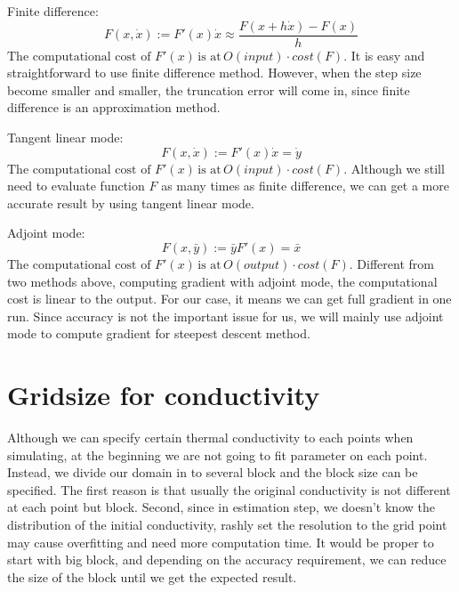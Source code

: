 \documentclass[10pt,a4paper]{report}
\begin{document}
Finite difference:
\[F(x,\dot{x}):=F'(x)\dot{x}\approx {\frac{F(x+h\dot{x})-F(x)}{h}}\]
$\text{The computational cost of }F'(x)\, \text{is at} \, O(input) \cdot cost(F)$.
It is easy and straightforward to use finite difference method. However, when the step size become smaller and smaller, the truncation error will come in, since finite difference is an approximation method. 

Tangent linear mode:
\[F(x,\dot{x}):=F'(x)\dot{x}=\dot{y}\]
$\text{The computational cost of }F'(x)\, \text{is at} \, O(input) \cdot cost(F)$. Although we still need to evaluate function $F$ as many times as finite difference, we can get a more accurate result by using tangent linear mode.

Adjoint mode:
\[F(x,\bar{y}):=\bar{y}F'(x)=\bar{x}\]
$\text{The computational cost of }F'(x)\, \text{is at} \, O(output) \cdot cost(F)$. Different from two methods above, computing gradient with adjoint mode, the computational cost is linear to the output. For our case, it means we can get full gradient in one run. Since accuracy is not the important issue for us, we will mainly use adjoint mode to compute gradient for steepest descent method. 
     



\section{Gridsize for conductivity}
Although we can specify certain thermal conductivity to each points when simulating, at the beginning we are not going to fit parameter on each point. Instead, we divide our domain in to several block and the block size can be specified. The first reason is that usually the original conductivity is not different at each point but block. Second, since in estimation step, we doesn't know the distribution of the initial conductivity, rashly set the resolution to the grid point may cause overfitting and need more computation time. It would be proper to start with big block, and depending on the accuracy requirement, we can reduce the size of the block until we get the expected result.   








\end{document}
